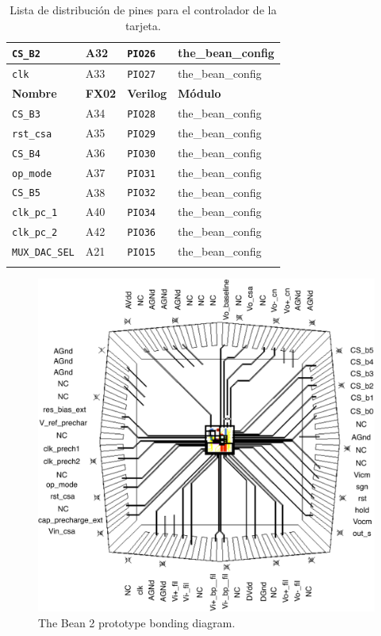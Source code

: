 \begin{center}
\begin{longtable}{|l|l|l|l|}
\verb=CS_B2= &A32&\verb+PIO26+& the\_bean\_config \\\hline
\verb=clk= &A33&\verb+PIO27+& the\_bean\_config \\\hline
{\bf Nombre} & {\bf FX02} & {\bf Verilog}&{\bf Módulo} \\ \hline\hline
\verb=CS_B3= &A34&\verb+PIO28+& the\_bean\_config \\\hline
\verb=rst_csa= &A35&\verb+PIO29+& the\_bean\_config \\\hline
\verb=CS_B4= &A36&\verb+PIO30+& the\_bean\_config \\\hline
\verb=op_mode= &A37&\verb+PIO31+& the\_bean\_config \\\hline
\verb=CS_B5= &A38&\verb+PIO32+& the\_bean\_config \\\hline
\verb=clk_pc_1= &A40&\verb+PIO34+& the\_bean\_config \\\hline
\verb=clk_pc_2= &A42&\verb+PIO36+& the\_bean\_config \\\hline
\verb=MUX_DAC_SEL= &A21&\verb+PIO15+& the\_bean\_config \\\hline
\caption{\label{pinout2}Lista de distribución de pines para el controlador de la tarjeta.}
\end{longtable}
\end{center}



\begin{figure}[!t]
	\centering
	\includegraphics[width=6in]{./Figures/bondpad.pdf}
	\caption{The Bean 2 prototype bonding diagram.}\label{fig:bondpad}
\end{figure}


